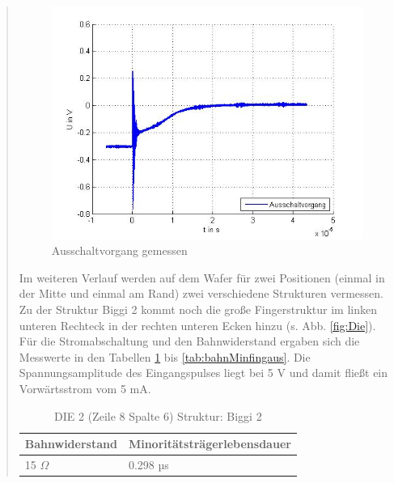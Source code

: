 \begin{quote}
	\begin{figure}[H]
        \centering
        \includegraphics[scale=0.7]{./SchaltverhaltenBilder/Ausschaltvorgang_bild.jpg}
        \caption{Ausschaltvorgang gemessen}
        \label{fig:aussgemessen}
    \end{figure}

	\vspace{2em}

	Im weiteren Verlauf werden auf dem Wafer für zwei Positionen (einmal in der
	Mitte und einmal am Rand) zwei verschiedene Strukturen vermessen. Zu der
	Struktur Biggi 2 kommt noch die große Fingerstruktur im linken unteren
	Rechteck in der rechten unteren Ecken hinzu (s. Abb. \ref{fig:Die}). Für die
	Stromabschaltung und den Bahnwiderstand ergaben sich die Messwerte in den
	Tabellen \ref{tab:bahnMinbigmitt} bis \ref{tab:bahnMinfingaus}. Die
	Spannungsamplitude des Eingangspulses liegt bei 5 V und damit fließt ein
	Vorwärtsstrom vom 5 mA.

	\vspace{2em}

      		\begin{table}[H]
     		  \begin{addmargin}[3cm]{3cm}
     			\centering
                   \begin{tabular}{|p{5cm}|p{5cm}|}
         			\hline
         			Bahnwiderstand &  Minoritätsträgerlebensdauer\\
         			\hline
        			15 $\Omega$ & 0.298 µs \\
        			\hline

                    \end{tabular}
              \end{addmargin}
              \caption{DIE 2 (Zeile 8 Spalte 6) Struktur: Biggi 2}
              \label{tab:bahnMinbigmitt}
            \end{table}


\end{quote}
